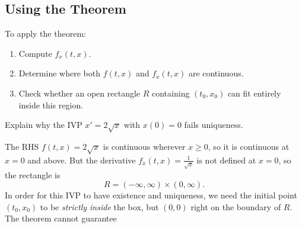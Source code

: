 \documentclass[11pt,letterpaper]{article}
\begin{document}
\subsection{Using the Theorem}
To apply the theorem:
\begin{enumerate}
    \item Compute $f_x(t,x)$.
    \item Determine where both $f(t,x)$ and $f_x(t,x)$ are continuous.
    \item Check whether an open rectangle $R$ containing $(t_0,x_0)$ can
    fit entirely inside this region.
\end{enumerate}


\begin{example}[1]{

 Explain why the IVP $x'=2\sqrt{x}$ with $x(0)=0$ fails uniqueness.

}
 
 The RHS $f(t,x)=2\sqrt{x}$ is continuous wherever $x\ge0$, so it is continuous at $x=0$ and above. But the derivative $f_x(t,x) = \frac{1}{\sqrt{x}}$ is not defined at $x=0$, so the rectangle is 
    $$
    R = (-\infty,\infty)\times (0,\infty).
    $$
    In order for this IVP to have existence and uniqueness, we need the initial point $(t_0,x_0)$ to be \emph{strictly inside} the box, but $(0,0)$ right on the boundary of $R$. The theorem cannot guarantee  

\begin{figure}[H]
\centering
{}

\end{figure}

    
\end{example}
\end{document}
